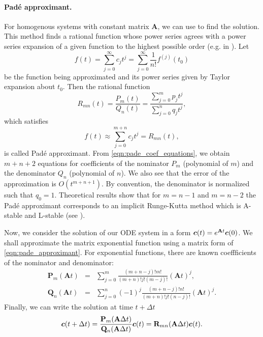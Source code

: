 \paragraph{Pad{\' e} approximant.}
For homogenous systems with constant matrix $\mathbf{A}$, we can use  
to find the solution. This method finds a rational function whose power series agrees with a power series expansion of 
a given function to the highest possible order (e.g. in \cite{press_numerical_1992}).
Let
\[
  f(t) = \sum\limits_{j=0}^{\infty} c_j t^j = \sum\limits_{j=0}^{\infty} \frac{1}{n!}f^{(j)}(t_0)
\]
be the function being approximated and its power series given by Taylor expansion about $t_0$.
Then the rational function
\begin{equation} \label{eqn:pade_approximant}
R_{mn}(t) = \frac{P_m(t)}{Q_n(t)} = \frac{\sum\limits_{j=0}^{m} p_jt^j}{\sum\limits_{j=0}^{n} q_jt^j},
\end{equation}
which satisfies 
\begin{equation} \label{eqn:pade_coef_equations}
f(t)\approx \sum\limits_{j=0}^{m+n} c_j t^j = R_{mn}(t),
\end{equation}
is called Pad{\' e} approximant. From \eqref{eqn:pade_coef_equations}, we obtain $m+n+2$ equations for
coefficients of the nominator $P_m$ (polynomial of  $m$) and 
the denominator $Q_n$ (polynomial of  $n$). We also see that the error 
of the approximation is $O(t^{m+n+1})$. By convention, the denominator is normalized such that $q_0=1$.
Theoretical results show that for $m=n-1$ and $m=n-2$ the Pad\'e approximant corresponds to an implicit Runge-Kutta method
which is A-stable and L-stable (see \cite{ehle1973}).

Now, we consider the solution of our ODE system in a form $\mathbf{\boldsymbol{c}}(t)=e^{\mathbf{A}t}\mathbf{\boldsymbol{c}}(0)$. We shall 
approximate the matrix exponential function using a matrix form of \eqref{eqn:pade_approximant}. 
For exponential functions, there are known coeffficients of the nominator and denominator:
\begin{eqnarray}
  \mathbf{P}_m(\mathbf{A}t) &=& \sum\limits^{m}_{j=0}\frac{(m+n-j)!m!}{(m+n)!j!(m-j)!} (\mathbf{A}t)^j, \\
  \mathbf{Q}_n(\mathbf{A}t) &=& \sum\limits^{n}_{j=0} (-1)^j \frac{(m+n-j)!n!}{(m+n)!j!(n-j)!} (\mathbf{A}t)^j.
\end{eqnarray}
Finally, we can write the solution at time $t+\Delta t$
\begin{equation} \label{eqn:pade_solution}
\vc{c}(t+\Delta t) = \frac{\mathbf{P}_m(\mathbf{A}\Delta t)} {\mathbf{Q}_n(\mathbf{A}\Delta t)}\vc{c}(t) 
= \mathbf{R}_{mn}(\mathbf{A}\Delta t)\vc{c}(t).
\end{equation}

